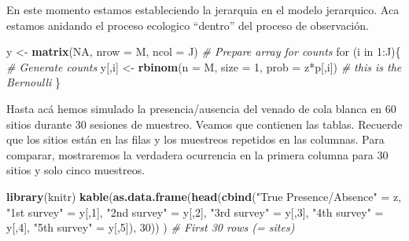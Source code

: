 \documentclass[]{book}
\newenvironment{Shaded}{\begin{snugshade}}{\end{snugshade}}
\newcommand{\KeywordTok}[1]{\textcolor[rgb]{0.13,0.29,0.53}{\textbf{{#1}}}}
\newcommand{\DataTypeTok}[1]{\textcolor[rgb]{0.13,0.29,0.53}{{#1}}}
\newcommand{\DecValTok}[1]{\textcolor[rgb]{0.00,0.00,0.81}{{#1}}}
\newcommand{\StringTok}[1]{\textcolor[rgb]{0.31,0.60,0.02}{{#1}}}
\newcommand{\CommentTok}[1]{\textcolor[rgb]{0.56,0.35,0.01}{\textit{{#1}}}}
\newcommand{\OtherTok}[1]{\textcolor[rgb]{0.56,0.35,0.01}{{#1}}}
\newcommand{\NormalTok}[1]{{#1}}
\begin{document}
En este momento estamos estableciendo la jerarquia en el modelo
jerarquico. Aca estamos anidando el proceso ecologico ``dentro'' del
proceso de observación.

\begin{Shaded}
\begin{Highlighting}[]
\NormalTok{y <-}\StringTok{ }\KeywordTok{matrix}\NormalTok{(}\OtherTok{NA}\NormalTok{, }\DataTypeTok{nrow =} \NormalTok{M, }\DataTypeTok{ncol =} \NormalTok{J)      }\CommentTok{# Prepare array for counts}
\NormalTok{for (i in }\DecValTok{1}\NormalTok{:J)\{                          }\CommentTok{# Generate counts}
   \NormalTok{y[,i] <-}\StringTok{ }\KeywordTok{rbinom}\NormalTok{(}\DataTypeTok{n =} \NormalTok{M, }\DataTypeTok{size =} \DecValTok{1}\NormalTok{, }\DataTypeTok{prob =} \NormalTok{z*p[,i])   }\CommentTok{# this is the Bernoulli}
\NormalTok{\}}
\end{Highlighting}
\end{Shaded}

Hasta acá hemos simulado la presencia/ausencia del venado de cola blanca
en 60 sitios durante 30 sesiones de muestreo. Veamos que contienen las
tablas. Recuerde que los sitios están en las filas y los muestreos
repetidos en las columnas. Para comparar, mostraremos la verdadera
ocurrencia en la primera columna para 30 sitios y solo cinco muestreos.

\begin{Shaded}
\begin{Highlighting}[]
\KeywordTok{library}\NormalTok{(knitr)}
\KeywordTok{kable}\NormalTok{(}\KeywordTok{as.data.frame}\NormalTok{(}\KeywordTok{head}\NormalTok{(}\KeywordTok{cbind}\NormalTok{(}\StringTok{"True Presence/Absence"} \NormalTok{=}\StringTok{ }\NormalTok{z, }
           \StringTok{"1st survey"} \NormalTok{=}\StringTok{ }\NormalTok{y[,}\DecValTok{1}\NormalTok{], }
           \StringTok{"2nd survey"} \NormalTok{=}\StringTok{ }\NormalTok{y[,}\DecValTok{2}\NormalTok{], }
           \StringTok{"3rd survey"} \NormalTok{=}\StringTok{ }\NormalTok{y[,}\DecValTok{3}\NormalTok{],}
           \StringTok{"4th survey"} \NormalTok{=}\StringTok{ }\NormalTok{y[,}\DecValTok{4}\NormalTok{],}
           \StringTok{"5th survey"} \NormalTok{=}\StringTok{ }\NormalTok{y[,}\DecValTok{5}\NormalTok{]), }\DecValTok{30}\NormalTok{)) )   }\CommentTok{# First 30 rows (= sites)}
\end{Highlighting}
\end{Shaded}
\end{document}
